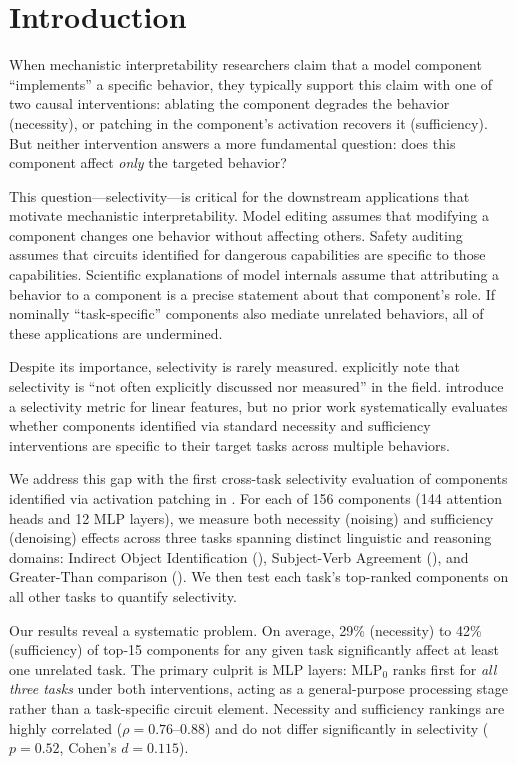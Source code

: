 \section{Introduction}
\label{sec:intro}

When mechanistic interpretability researchers claim that a model component ``implements'' a specific behavior, they typically support this claim with one of two causal interventions: ablating the component degrades the behavior (necessity), or patching in the component's activation recovers it (sufficiency). But neither intervention answers a more fundamental question: does this component affect \emph{only} the targeted behavior?

This question---selectivity---is critical for the downstream applications that motivate mechanistic interpretability. Model editing assumes that modifying a component changes one behavior without affecting others. Safety auditing assumes that circuits identified for dangerous capabilities are specific to those capabilities. Scientific explanations of model internals assume that attributing a behavior to a component is a precise statement about that component's role. If nominally ``task-specific'' components also mediate unrelated behaviors, all of these applications are undermined.

Despite its importance, selectivity is rarely measured. \citet{mueller2024quest} explicitly note that selectivity is ``not often explicitly discussed nor measured'' in the field. \citet{arora2024causalgym} introduce a selectivity metric for linear features, but no prior work systematically evaluates whether components identified via standard necessity and sufficiency interventions are specific to their target tasks across multiple behaviors.

We address this gap with the first cross-task selectivity evaluation of components identified via activation patching in \gptsmall. For each of 156 components (144 attention heads and 12 MLP layers), we measure both necessity (noising) and sufficiency (denoising) effects across three tasks spanning distinct linguistic and reasoning domains: Indirect Object Identification (\ioi), Subject-Verb Agreement (\sva), and Greater-Than comparison (\gt). We then test each task's top-ranked components on all other tasks to quantify selectivity.

Our results reveal a systematic problem. On average, 29\% (necessity) to 42\% (sufficiency) of top-15 components for any given task significantly affect at least one unrelated task. The primary culprit is MLP layers: MLP$_0$ ranks first for \emph{all three tasks} under both interventions, acting as a general-purpose processing stage rather than a task-specific circuit element. Necessity and sufficiency rankings are highly correlated ($\rho = 0.76$--$0.88$) and do not differ significantly in selectivity ($p = 0.52$, Cohen's $d = 0.115$).

